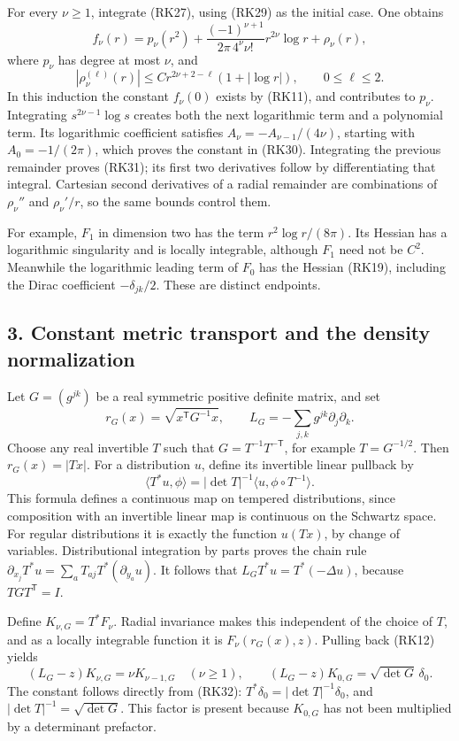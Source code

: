 \documentclass[
  11pt,
]{article}
\begin{document}
For every \(\nu\geq1\), integrate (RK27), using (RK29) as the initial
case. One obtains \[
 f_\nu(r)=p_\nu(r^2)
 +\frac{(-1)^{\nu+1}}{2\pi\,4^\nu\nu!}r^{2\nu}\log r
 +\rho_\nu(r),
 \tag{RK30}
\] where \(p_\nu\) has degree at most \(\nu\), and \[
 |\rho_\nu^{(\ell)}(r)|
 \leq C r^{2\nu+2-\ell}(1+|\log r|),
 \qquad 0\leq\ell\leq2.
 \tag{RK31}
\] In this induction the constant \(f_\nu(0)\) exists by (RK11), and
contributes to \(p_\nu\). Integrating \(s^{2\nu-1}\log s\) creates both
the next logarithmic term and a polynomial term. Its logarithmic
coefficient satisfies \(A_\nu=-A_{\nu-1}/(4\nu)\), starting with
\(A_0=-1/(2\pi)\), which proves the constant in (RK30). Integrating the
previous remainder proves (RK31); its first two derivatives follow by
differentiating that integral. Cartesian second derivatives of a radial
remainder are combinations of \(\rho_\nu''\) and \(\rho_\nu'/r\), so the
same bounds control them.

For example, \(F_1\) in dimension two has the term \(r^2\log r/(8\pi)\).
Its Hessian has a logarithmic singularity and is locally integrable,
although \(F_1\) need not be \(C^2\). Meanwhile the logarithmic leading
term of \(F_0\) has the Hessian (RK19), including the Dirac coefficient
\(-\delta_{jk}/2\). These are distinct endpoints.

\subsection{3. Constant metric transport and the density
normalization}\label{constant-metric-transport-and-the-density-normalization}

Let \(G=(g^{jk})\) be a real symmetric positive definite matrix, and set
\[
 r_G(x)=\sqrt{x^{\mathsf T}G^{-1}x},\qquad
 L_G=-\sum_{j,k}g^{jk}\partial_j\partial_k.
\] Choose any real invertible \(T\) such that
\(G=T^{-1}T^{-\mathsf T}\), for example \(T=G^{-1/2}\). Then
\(r_G(x)=|Tx|\). For a distribution \(u\), define its invertible linear
pullback by \[
 \langle T^*u,\phi\rangle
 =|\det T|^{-1}\langle u,\phi\circ T^{-1}\rangle.
 \tag{RK32}
\] This formula defines a continuous map on tempered distributions,
since composition with an invertible linear map is continuous on the
Schwartz space. For regular distributions it is exactly the function
\(u(Tx)\), by change of variables. Distributional integration by parts
proves the chain rule
\(\partial_{x_j}T^*u=\sum_aT_{aj}T^*(\partial_{y_a}u)\). It follows that
\(L_GT^*u=T^*(-\Delta u)\), because \(TGT^{\mathsf T}=I\).

Define \(K_{\nu,G}=T^*F_\nu\). Radial invariance makes this independent
of the choice of \(T\), and as a locally integrable function it is
\(F_\nu(r_G(x),z)\). Pulling back (RK12) yields \[
 (L_G-z)K_{\nu,G}=\nu K_{\nu-1,G}\quad(\nu\geq1),\qquad
 (L_G-z)K_{0,G}=\sqrt{\det G}\,\delta_0.
 \tag{RK33}
\] The constant follows directly from (RK32):
\(T^*\delta_0=|\det T|^{-1}\delta_0\), and
\(|\det T|^{-1}=\sqrt{\det G}\). This factor is present because
\(K_{0,G}\) has not been multiplied by a determinant prefactor.
\end{document}
